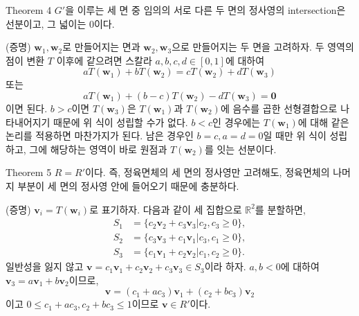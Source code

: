 \documentclass[11pt,t]{beamer}
\begin{document}
\begin{frame}
	\begin{block}{Theorem 4}
		$G'$을 이루는 세 면 중 임의의 서로 다른 두 면의 정사영의 intersection은 선분이고, 그 넓이는 0이다.
	\end{block}
(증명) $\mathbf{w}_1, \mathbf{w}_2$로 만들어지는 면과 $\mathbf{w}_2, \mathbf{w}_3$으로 만들어지는 두 면을 고려하자.  두 영역의 점이 변환 $T$ 이후에 같으려면 스칼라 $a,b,c,d \in[0,1]$에 대하여
\[aT(\mathbf{w}_1)+bT(\mathbf{w}_2)=cT(\mathbf{w}_2)+dT(\mathbf{w}_3)\]
또는
\[aT(\mathbf{w}_1)+(b-c)T(\mathbf{w}_2)-dT(\mathbf{w}_3)=\mathbf{0}\] 
이면 된다. $b>c$이면 $T(\mathbf{w}_3)$은 $T(\mathbf{w}_1)$과 $T(\mathbf{w}_2)$에 음수를 곱한 선형결합으로 나타내어지기 때문에 위 식이 성립할 수가 없다. $b<c$인 경우에는 $T(\mathbf{w}_1)$에 대해 같은 논리를 적용하면 마찬가지가 된다. 남은 경우인 $b=c, a=d=0$일 때만 위 식이 성립하고, 그에 해당하는 영역이 바로 원점과 $T(\mathbf{w}_2)$를 잇는 선분이다.
\end{frame}

\begin{frame}
	\begin{block}{Theorem 5}
		$R=R'$이다. 즉, 정육면체의 세 면의 정사영만 고려해도, 정육면체의 나머지 부분이 세 면의 정사영 안에 들어오기 때문에 충분하다.
	\end{block}
(증명) $\mathbf{v}_i=T(\mathbf{w}_i)$로 표기하자. 다음과 같이 세 집합으로 $\mathbb{R}^2$를 분할하면,
\begin{align*}
S_1&=\{c_2 \mathbf{v}_2+c_3\mathbf{v}_3|c_2,c_3 \geq 0\},\\
S_2&=\{c_3 \mathbf{v}_3+c_1\mathbf{v}_1|c_3,c_1 \geq 0\},\\
S_3&=\{c_1 \mathbf{v}_1+c_2\mathbf{v}_2|c_1,c_2 \geq 0\}.
\end{align*}
 일반성을 잃지 않고 $\mathbf{v}=c_1\mathbf{v}_1+c_2\mathbf{v}_2+c_3\mathbf{v}_3 \in S_3$이라 하자. $a,b<0$에 대하여 $\mathbf{v}_3=a \mathbf{v}_1 + b\mathbf{v}_2$이므로, 
\[ \mathbf{v}=(c_1+ac_3)\mathbf{v}_1 + (c_2+bc_3)\mathbf{v}_2\]
이고 $0 \leq c_1+ac_3, c_2+bc_3 \leq 1$이므로 $\mathbf{v} \in R'$이다.
\end{frame}
\end{document}
